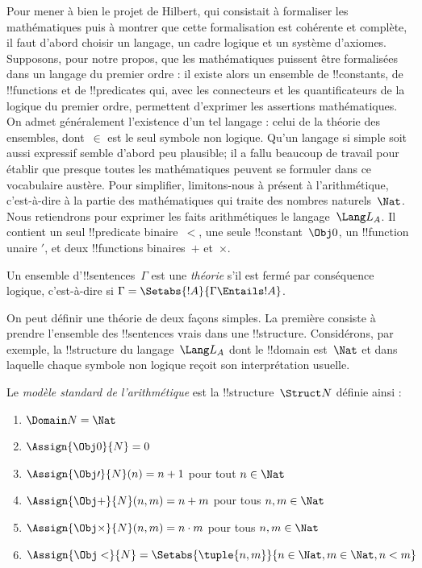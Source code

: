 \documentclass[../../../include/open-logic-section]{subfiles}
\begin{document}


Pour mener à bien le projet de Hilbert, qui consistait à formaliser
les mathématiques puis à montrer que cette formalisation est cohérente
et complète, il faut d'abord choisir un langage, un cadre logique et
un système d'axiomes. Supposons, pour notre propos, que les
mathématiques puissent être formalisées dans un langage du premier
ordre : il existe alors un ensemble de !!{constant}s, de
!!{function}s et de !!{predicate}s qui, avec les connecteurs et les
quantificateurs de la logique du premier ordre, permettent d'exprimer
les assertions mathématiques. On admet généralement l'existence d'un
tel langage : celui de la théorie des ensembles, dont~$\in$ est le
seul symbole non logique. Qu'un langage si simple soit aussi expressif
semble d'abord peu plausible; il a fallu beaucoup de travail pour
établir que presque toutes les mathématiques peuvent se formuler dans
ce vocabulaire austère. Pour simplifier, limitons-nous à présent à
l'arithmétique, c'est-à-dire à la partie des mathématiques qui traite
des nombres naturels~$\Nat$. Nous retiendrons pour exprimer les
faits arithmétiques le langage~$\Lang L_A$. Il contient un seul !!{predicate}
binaire~$<$, une seule !!{constant}~$\Obj 0$, un !!{function} unaire
$\prime$, et deux !!{function}s binaires~$+$ et~$\times$.

\begin{defn}
Un ensemble d'!!{sentence}s~$\Gamma$ est une \emph{théorie} s'il est
fermé par conséquence logique, c'est-à-dire si
$\Gamma=\Setabs{!A}{\Gamma\Entails !A}$.
\end{defn}

On peut définir une théorie de deux façons simples. La première
consiste à prendre l'ensemble des !!{sentence}s vrais dans une
!!{structure}. Considérons, par exemple, la !!{structure} du
langage~$\Lang L_A$ dont le !!{domain} est~$\Nat$ et dans laquelle
chaque symbole non logique reçoit son interprétation usuelle.

\begin{defn}
Le \emph{modèle standard de l'arithmétique} est la !!{structure}~$\Struct
N$ définie ainsi :
\begin{enumerate}
\item $\Domain N = \Nat$
\item $\Assign{\Obj 0}{N} = 0$
\item $\Assign{\Obj \prime}{N}(n) = n + 1$ pour tout $n \in \Nat$
\item $\Assign{\Obj +}{N}(n, m) = n + m$ pour tous $n, m \in \Nat$
\item $\Assign{\Obj \times}{N}(n, m) = n\cdot m$ pour tous $n, m \in \Nat$
\item $\Assign{\Obj <}{N} = \Setabs{\tuple{n, m}}{n \in \Nat, m \in
  \Nat, n < m}$
\end{enumerate}
\end{defn}
\end{document}
